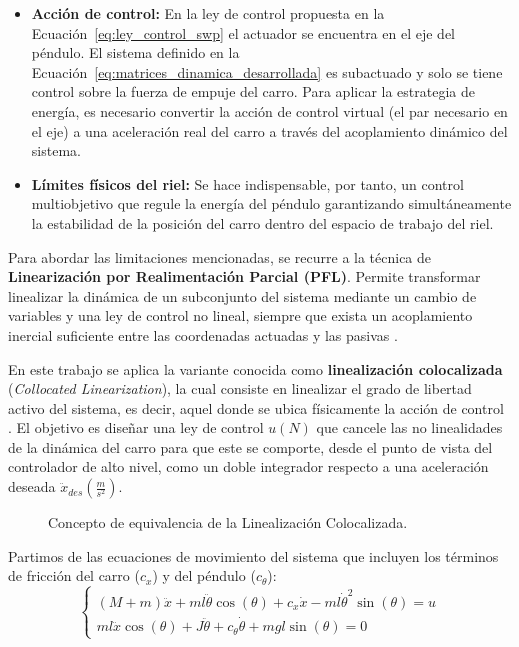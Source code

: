 \documentclass[11pt,fleqn]{book} %
\begin{document}
\begin{itemize}[topsep=5pt, itemsep=4pt] %
	\item \textbf{Acción de control:} En la ley de control propuesta en la Ecuación~\ref{eq:ley_control_swp} el actuador se encuentra en el eje del péndulo. El sistema definido en la Ecuación~\ref{eq:matrices_dinamica_desarrollada} es subactuado y solo se tiene control sobre la fuerza de empuje del carro. Para aplicar la estrategia de energía, es necesario convertir la acción de control virtual (el par necesario en el eje) a una aceleración real del carro a través del acoplamiento dinámico del sistema.
	
	\item \textbf{Límites físicos del riel:} Se hace indispensable, por tanto, un control multiobjetivo que regule la energía del péndulo garantizando simultáneamente la estabilidad de la posición del carro dentro del espacio de trabajo del riel.
\end{itemize}

Para abordar las limitaciones mencionadas, se recurre a la técnica de \textbf{Linearización por Realimentación Parcial (PFL)}\cite{spong1994}. Permite transformar linealizar la dinámica de un subconjunto del sistema mediante un cambio de variables y una ley de control no lineal, siempre que exista un acoplamiento inercial suficiente entre las coordenadas actuadas y las pasivas \cite{spong1994}.

En este trabajo se aplica la variante conocida como \textbf{linealización colocalizada} (\textit{Collocated Linearization}), la cual consiste en linealizar el grado de libertad activo del sistema, es decir, aquel donde se ubica físicamente la acción de control \cite{spong1994}. El objetivo es diseñar una ley de control $u (N)$ que cancele las no linealidades de la dinámica del carro para que este se comporte, desde el punto de vista del controlador de alto nivel, como un doble integrador respecto a una aceleración deseada $\ddot{x}_{des} (\frac{m}{s^2})$.
\begin{figure}[ht]
	\centering
	\resizebox{\textwidth}{!}{%
		
	}
	\caption{Concepto de equivalencia de la Linealización Colocalizada.}
	\label{fig:equivalencia_PFL}
\end{figure}

\FloatBarrier
\newpage

Partimos de las ecuaciones de movimiento del sistema que incluyen los términos de fricción del carro ($c_x$) y del péndulo ($c_{\theta}$):
\begin{equation}
	\begin{cases}
		(M + m)\ddot{x} + ml\ddot{\theta}\cos(\theta) + c_x\dot{x} - ml\dot{\theta}^2\sin(\theta) = u \\
		ml\ddot{x}\cos(\theta) + J\ddot{\theta} + c_{\theta}\dot{\theta} + mgl\sin(\theta) = 0
	\end{cases}\label{eq:ec_mov}
\end{equation}
\end{document}
